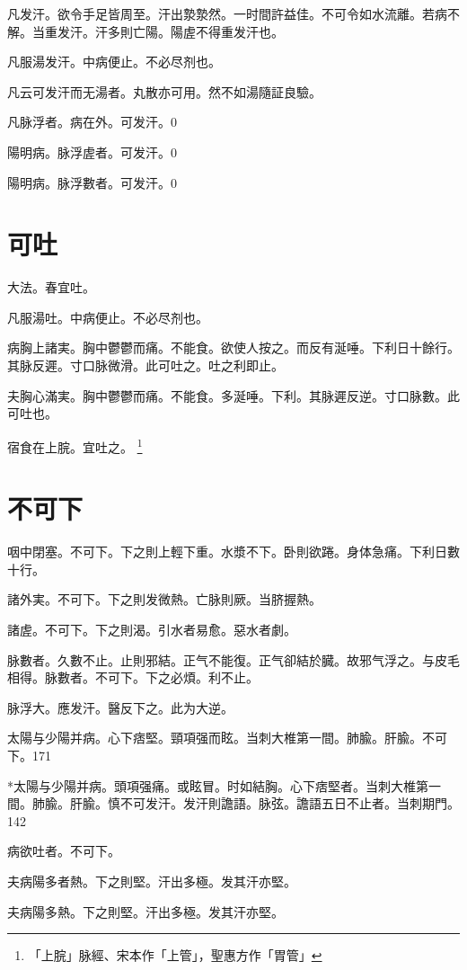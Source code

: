 凡发汗。欲令手足皆周至。汗出漐漐然。一时間許益佳。不可令如水流離。若病不解。当重发汗。汗多則亡陽。陽虗不得重发汗也。

凡服湯发汗。中病便止。不必尽剂也。

凡云可发汗而无湯者。丸散亦可用。然不如湯隨証良驗。

凡脉浮者。病在外。可发汗。0

陽明病。脉浮虗者。可发汗。{\yifang}0

陽明病。脉浮數者。可发汗。{\gaoben}0

\section{可吐}

大法。春宜吐。

凡服湯吐。中病便止。不必尽剂也。

病胸上諸実。胸中鬱鬱而痛。不能食。欲使人按之。而反有涎唾。下利日十餘行。其脉反遲。寸口{\khaaitp 脉}微滑。此可吐之。吐之利即止。

夫胸心滿実。胸中鬱鬱而痛。不能食。多涎唾。下利。其脉遲反逆。寸口脉數。此可吐也。{\gaoben}

宿食在上脘。宜吐之。
	\footnote{「上脘」脉經、宋本作「上管」，聖惠方作「胃管」}

\section{不可下}

咽中閉塞。不可下。下之則上輕下重。水漿不下。卧則欲踡。身体急痛。下利日數十行。

諸外実。不可下。下之則发微熱。亡脉則厥。当脐握熱。

諸虗。不可下。下之則渴。引水者易愈。惡水者劇。

脉數者。久數不止。止則邪結。正气不能復。正气卻結於臓。故邪气浮之。与皮毛相得。脉數者。不可下。下之必煩。利不止。

脉浮大。應发汗。醫反下之。此为大逆。

太陽与少陽并病。心下痞堅。頸項强而眩。{\khaaitp 当刺大椎第一間。肺腧。肝腧。}不可下。171

*太陽与少陽并病。頭項强痛。或眩冒。时如結胸。心下痞堅者。当刺大椎第一間。肺腧。肝腧。慎不可发汗。发汗則譫語。脉弦。譫語五日不止者。当刺期門。142

病欲吐者。不可下。

夫病陽多者熱。下之則堅。汗出多極。发其汗亦堅。

夫病陽多熱。下之則堅。汗出多極。发其汗亦堅。{\yuhan}

